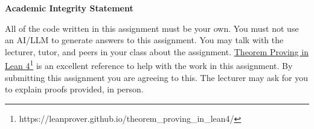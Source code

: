 \documentclass[12pt,letterpaper, onecolumn]{exam}
\begin{document}
\vspace{2mm}
\textbf{Academic Integrity Statement}

All of the code written in this assignment must be your own. You must not use an AI/LLM to generate answers to this assignment. You may talk with the lecturer, tutor, and peers in your class about the assignment. \href{https://leanprover.github.io/theorem_proving_in_lean4/}{Theorem Proving in Lean 4}\footnote{https://leanprover.github.io/theorem\_proving\_in\_lean4/} is an excellent reference to help with the work in this assignment. By submitting this assignment you are agreeing to this. The lecturer may ask for you to explain proofs provided, in person. 
\end{document}
